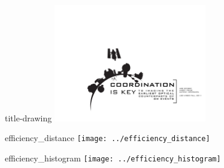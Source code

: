 \documentclass[landscape]{a0poster}
\begin{document}
\begin{staticcontents*}{title-drawing}
\includegraphics[width=0.5\textwidth]{title-drawing.pdf}
\end{staticcontents*}

\begin{staticcontents*}{efficiency_distance}
\texttt{[image: ../efficiency\_distance]}
\end{staticcontents*}

\begin{staticcontents*}{efficiency_histogram}
\texttt{[image: ../efficiency\_histogram]}
\end{staticcontents*}
\end{document}
